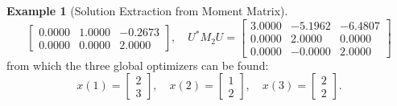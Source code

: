 \documentclass[
]{book}
\theoremstyle{definition}
\theoremstyle{definition}
\newtheorem{example}{Example}[chapter]
\theoremstyle{definition}
\theoremstyle{definition}
\theoremstyle{remark}
\begin{document}
\begin{example}[Solution Extraction from Moment Matrix]
\[\begin{bmatrix}
    0.0000    & 1.0000   & -0.2673\\
   0.0000    & 0.0000   & 2.0000
\end{bmatrix}, \quad 
U^* M_2 U = \begin{bmatrix}
3.0000   & -5.1962   & -6.4807\\
    0.0000    & 2.0000    & 0.0000\\
    0.0000   & -0.0000    & 2.0000
\end{bmatrix}
\]
from which the three global optimizers can be found:
\[
x(1) = \begin{bmatrix} 2 \\ 3 \end{bmatrix}, \quad 
x(2) = \begin{bmatrix} 1 \\ 2 \end{bmatrix}, \quad 
x(3) = \begin{bmatrix} 2 \\ 2 \end{bmatrix}.
\]
\end{example}

  
\end{document}
